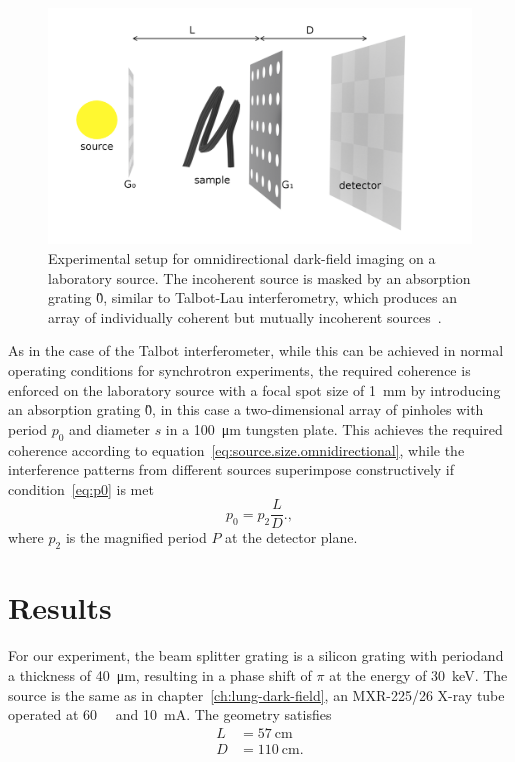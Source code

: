 \begin{figure}[htb]
    \centering
    \includegraphics[width=\textwidth]{gfx/omnidirectional/schematic-with-arrows.png}
    \caption{Experimental setup for omnidirectional dark-field imaging on a
    laboratory source. The incoherent source is masked by an absorption
grating \G0, similar to Talbot-Lau interferometry, which produces an array
of individually coherent but mutually incoherent
sources~\cite{kagias2018omnidir}.}
    \label{fig:omnidirectional-lab}
\end{figure}

As in the case of the Talbot interferometer, while this can be achieved in
normal operating conditions for synchrotron experiments, the required
coherence is enforced on the laboratory source with a focal spot size of
\SI{1}{\milli\meter} by introducing an absorption grating \G0, in this case
a two-dimensional array of pinholes with period $p_0$ and diameter $s$ in a \SI{100}{\micro\meter} tungsten
plate. This achieves the required coherence according to
equation~\eqref{eq:source.size.omnidirectional}, while the interference
patterns from different sources superimpose constructively if
condition~\eqref{eq:p0} is met
\begin{equation}
    p_0 = p_2 \frac{L}{D}.\label{eq:p0.omnidirectional},
\end{equation}
where $p_2$ is the magnified period $P$ at the detector plane.

\section{Results}
For our experiment, the beam splitter grating is a silicon grating with
period\cn and a thickness of \SI{40}{\micro\meter}, resulting in a phase
shift of $\pi$ at the energy of \SI{30}{\kilo\eV}. The source is the same as
in chapter~\ref{ch:lung-dark-field}, an MXR-225/26 X-ray tube operated at
\SI{60}{\kilo\voltpeak} and \SI{10}{\milli\ampere}.
The geometry satisfies
\begin{align*}
    L &= \SI{57}{\centi\meter}\\
    D &= \SI{110}{\centi\meter}.
\end{align*}

